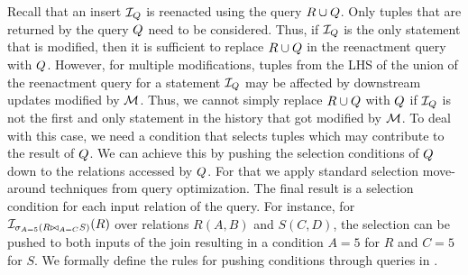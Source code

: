 

Recall that an insert $\mathcal{I}_{Q}$ is reenacted using the query $R \cup Q$. Only tuples that are returned by the query $Q$ need to be considered. Thus, if $\mathcal{I}_{Q}$ is the only statement that is modified, then it is sufficient to replace $R \cup Q$ in the reenactment query with $Q$. However, for multiple modifications, tuples from the LHS of the union of the reenactment query for a statement $\mathcal{I}_{Q}$ may be affected by downstream updates modified by $\mathcal{M}$. Thus, we cannot simply replace $R \cup Q$ with $Q$ if $\mathcal{I}_{Q}$ is not the first and only statement in the history that got modified by $\mathcal{M}$. To deal with this case, we need a condition that selects tuples which may contribute to the result of $Q$. We can achieve this by pushing the selection conditions of $Q$ down to the relations accessed by $Q$. For that we apply standard selection move-around techniques from query optimization. The final result is a selection condition for each input relation of the query. For instance, for $\mathcal{I}_{\sigma_{A=5}(R \bowtie_{A=C} S)}(R)$ over relations $R(A,B)$ and $S(C,D)$, the selection can be pushed to both inputs of the join resulting in a condition $A=5$ for $R$ and $C=5$ for $S$.
We formally define the rules for pushing conditions through queries in \cite{techreport}.



